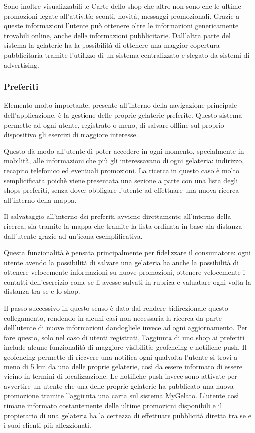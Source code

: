Sono inoltre visualizzabili le Carte dello shop che altro non sono che le ultime promozioni legate all'attività: sconti, novità, messaggi promozionali.
Grazie a queste informazioni l'utente può ottenere oltre le informazioni genericamente trovabili online, anche delle informazioni pubblicitarie.
Dall'altra parte del sistema la gelaterie ha la possibilità di ottenere una maggior copertura pubblicitaria tramite l'utilizzo di un sistema centralizzato e slegato da sistemi di advertising.

\subsubsection{Preferiti}
Elemento molto importante, presente all'interno della navigazione principale dell'applicazione, è la gestione delle proprie gelaterie preferite.
Questo sistema permette ad ogni utente, registrato o meno, di salvare offline sul proprio dispositivo gli esercizi di maggiore interesse.

Questo dà modo all'utente di poter accedere in ogni momento, specialmente in mobilità, alle informazioni che più gli interessavano di ogni gelateria: indirizzo, recapito telefonico ed eventuali promozioni.
La ricerca in questo caso è molto semplicificata poichè viene presentata una sezione a parte con una lista degli shops preferiti, senza dover obbligare l'utente ad effettuare una nuova ricerca all'interno della mappa.

Il salvataggio all'interno dei preferiti avviene direttamente all'interno della ricerca, sia tramite la mappa che tramite la lista ordinata in base ala distanza dall'utente grazie ad un'icona esemplificativa.

Questa funzionalità è pensata principalmente per fidelizzare il consumatore: ogni utente avendo la possibilità di salvare una gelateria ha anche la possibilità di ottenere velocemente informazioni su nuove promozioni, ottenere velocemente i contatti dell'esercizio come se li avesse salvati in rubrica e valuatare ogni volta la distanza tra se e lo shop.

Il passo successivo in questo senso è dato dal rendere bidirezionale questo collegamento, rendendo in alcuni casi non necessaria la ricerca da parte dell'utente di nuove informazioni dandogliele invece ad ogni aggiornamento.
Per fare questo, solo nel caso di utenti registrati, l'aggiunta di uno shop ai preferiti include alcune funzionalità di maggiore visibilità: geofencing e notifiche push.
Il geofencing permette di ricevere una notifica ogni qualvolta l'utente si trovi a meno di 5 km da una delle proprie gelaterie, così da essere informato di essere vicino in termini di localizzazione.
Le notifiche push invece sono attivate per avvertire un utente che una delle proprie gelaterie ha pubblicato una nuova promozione tramite l'aggiunta una carta sul sistema MyGelato.
L'utente così rimane informato costantemente delle ultime promozioni disponibili e il propietario di una gelateria ha la certezza di effettuare pubblicità diretta tra se e i suoi clienti più affezzionati.


